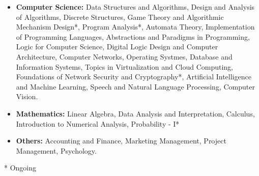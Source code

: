 \begin{itemize}[itemsep = -1.3 mm, leftmargin=*]
% 
\item {\bf Computer Science:} Data Structures and Algorithms, Design 
and Analysis of Algorithms, Discrete Structures, Game Theory and Algorithmic Mechanism Design*, Program Analysis*, Automata Theory, 
Implementation of Programming Languages, Abstractions and Paradigms in 
Programming, Logic for Computer Science, Digital Logic Design and Computer 
Architecture, Computer Networks, Operating Systmes, Database and 
Information Systems, Topics in Virtualization and Cloud Computing,
Foundations of Network Security and Cryptography*, Artificial 
Intelligence and Machine Learning, Speech and Natural Language Processing, Computer Vision.
    
    \item {\bf Mathematics:} Linear Algebra, Data Analysis and Interpretation, Calculus, Introduction to Numerical Analysis, Probability - I*
    \item {\bf Others:} Accounting and Finance, Marketing Management, Project Management, Psychology.
\end{itemize}
\vspace{-10pt}
* Ongoing